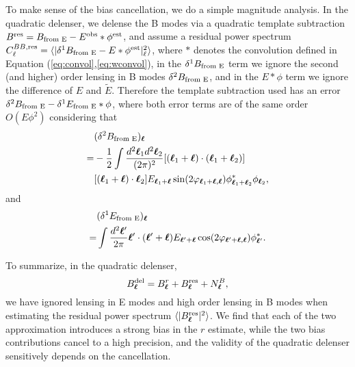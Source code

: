 \documentclass[aps, prd, reprint, nofootinbib, groupedaddress, showpacs]{revtex4-1}
\def\be{\begin{equation}}
\def\ee{\end{equation}}
\newcommand*\Bell{\ensuremath{\boldsymbol\ell}}
\begin{document}
\begin{enumerate}[label=(\roman*)]
To make sense of the bias cancellation, we do a simple magnitude analysis.
In the quadratic delenser, we delense the B modes via a quadratic template subtraction
$B^{\rm res} = B_{\text{\rm from E}}- E^{\rm obs}*\phi^{\rm est}$,
and assume a residual power spectrum
$C^{BB,{\rm res}}_\ell = \langle |\delta^1 B_{\text{\rm from E}}- E*\phi^{\rm est}|_\ell^2 \rangle$,
where $*$ denotes the convolution defined in Equation (\ref{eq:convol},\ref{eq:wconvol}),
in the $\delta^1 B_{\text{\rm from E}}$ term we ignore
the second (and higher) order lensing in B modes $\delta^2 B_{\text{\rm from E}}$,
and in the $E*\phi$ term we ignore the difference of $E$ and $\widetilde E$.
Therefore the template subtraction used has an error
$\delta^2 B_{\text{\rm from E}}- \delta^1 E_{\text{\rm from E}} * \phi$,
where both error terms are of the same order $O(E\phi^2)$ considering that
\be
\begin{aligned}
&(\delta^2 B_{\text{\rm from E}})_{\Bell} \\
=& -\frac{1}{2}\int \frac{d^2 {\Bell_1}d^2 {\Bell_2}}{(2\pi)^2}
[({\Bell_1}+ {\Bell})\cdot({\Bell_1}+ {\Bell_2})]  \\
& [({\Bell_1}+ {\Bell})\cdot {\Bell_2}] E_{{\Bell_1}+ {\Bell}} \sin(2\varphi_{{\Bell_1}+ {\Bell}, {\Bell}})
\phi^*_{{\Bell_1}+ {\Bell_2}} \phi_{\Bell_2},
\end{aligned}
\ee
and
\be
\begin{aligned}
&(\delta^1 E_{\text{\rm from E}})_{\Bell} \\
= & \int \frac{d^2 {\Bell'}}{2\pi} {\Bell'} \cdot ({\Bell'}+ \Bell) E_{{\Bell'}+\Bell}
\cos(2\varphi_{{\Bell'}+\Bell,\Bell}) \phi^*_{\Bell'}.
\end{aligned}
\ee

\end{enumerate}


To summarize, in the quadratic delenser,
\be
B^{\rm del}_{\Bell} = B^r_{\Bell} + B^{\rm res}_{\Bell} + N^B_{\Bell},
\ee
we have ignored lensing in E modes and high order lensing in B modes when estimating
the residual power spectrum $\langle |B^{\rm res}_{\Bell}|^2\rangle$.
We find that each of the two approximation introduces a strong bias in the $r$ estimate,
while the two bias contributions cancel to a high precision,
and the validity of the quadratic delenser sensitively depends on the cancellation.
\end{document}
